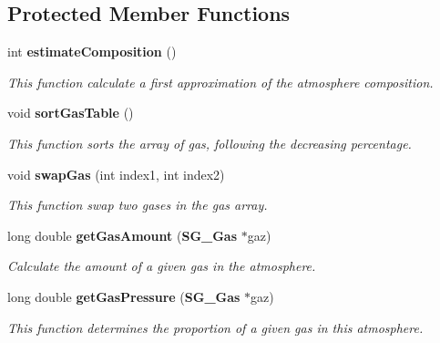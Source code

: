 \subsection*{Protected Member Functions}
\begin{CompactItemize}
\item 
int {\bf estimate\-Composition} ()
\begin{CompactList}\small\item\em This function calculate a first approximation of the atmosphere composition. \item\end{CompactList}\item 
void {\bf sort\-Gas\-Table} ()\label{class_s_g___atmosphere_b2}

\begin{CompactList}\small\item\em This function sorts the array of gas, following the decreasing percentage. \item\end{CompactList}\item 
void {\bf swap\-Gas} (int index1, int index2)\label{class_s_g___atmosphere_b3}

\begin{CompactList}\small\item\em This function swap two gases in the gas array. \item\end{CompactList}\item 
long double {\bf get\-Gas\-Amount} ({\bf SG\_\-Gas} $\ast$gaz)
\begin{CompactList}\small\item\em Calculate the amount of a given gas in the atmosphere. \item\end{CompactList}\item 
long double {\bf get\-Gas\-Pressure} ({\bf SG\_\-Gas} $\ast$gaz)
\begin{CompactList}\small\item\em This function determines the proportion of a given gas in this atmosphere. \item\end{CompactList}\end{CompactItemize}
